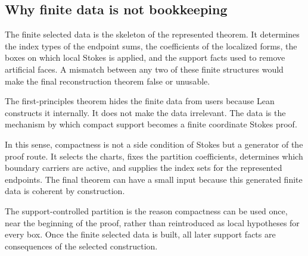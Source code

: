 \subsection{Why finite data is not bookkeeping}

The finite selected data is the skeleton of the represented theorem.  It
determines the index types of the endpoint sums, the coefficients of the
localized forms, the boxes on which local Stokes is applied, and the support
facts used to remove artificial faces.  A mismatch between any two of these
finite structures would make the final reconstruction theorem false or
unusable.

The first-principles theorem hides the finite data from users because Lean
constructs it internally.  It does not make the data irrelevant.  The data is
the mechanism by which compact support becomes a finite coordinate Stokes
proof.

In this sense, compactness is not a side condition of Stokes but a generator
of the proof route.  It selects the charts, fixes the partition coefficients,
determines which boundary carriers are active, and supplies the index sets for
the represented endpoints.  The final theorem can have a small input because
this generated finite data is coherent by construction.

\begin{remark}
The support-controlled partition is the reason compactness can be used once,
near the beginning of the proof, rather than reintroduced as local hypotheses
for every box.  Once the finite selected data is built, all later support facts
are consequences of the selected construction.
\end{remark}
